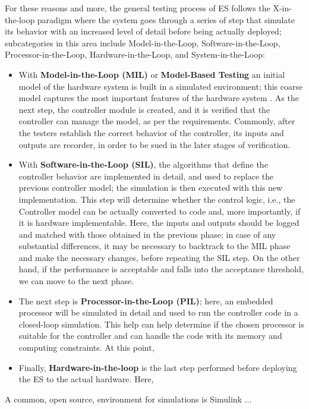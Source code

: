 For these reasons and more, the general testing process of ES follows the X-in-the-loop paradigm \cite{DBLP:journals/software/GarousiFKY18} where the system goes through a series of step that simulate its behavior with an increased level of detail before being actually deployed; subcategories in this area include Model-in-the-Loop, Software-in-the-Loop, Processor-in-the-Loop, Hardware-in-the-Loop, and System-in-the-Loop:
\begin{itemize}
    \item With \textbf{Model-in-the-Loop (MIL)} or \textbf{Model-Based Testing} an initial model of the hardware system is built in a simulated environment; this coarse model captures the most important features of the hardware system \cite{XLoop}. As the next step, the controller module is created, and it is verified that the controller can manage the model, as per the requirements. Commonly, after the testers establish the correct behavior of the controller, its inputs and outputs are recorder, in order to be sued in the later stages of verification.
    \item With \textbf{Software-in-the-Loop (SIL)}, the algorithms that define the controller behavior are implemented in detail, and used to replace the previous controller model; the simulation is then executed with this new implementation. This step will determine whether the control logic, i.e., the Controller model can be actually converted to code and, more importantly, if it is hardware implementable. Here, the inputs and outputs should be logged and matched with those obtained in the previous phase; in case of any substantial differences, it may be necessary to backtrack to the MIL phase and make the necessary changes, before repeating the SIL step. On the other hand, if the performance is acceptable and falls into the acceptance threshold, we can move to the next phase.
    \item The next step is \textbf{Processor-in-the-Loop (PIL)}; here, an embedded processor will be simulated in detail and used to run the controller code in a closed-loop simulation. This help can help determine if the chosen processor is suitable for the controller and can handle the code with its memory and computing constraints. At this point, 
    \item Finally, \textbf{Hardware-in-the-loop} is the last step performed before deploying the ES to the actual hardware. Here, 
\end{itemize}


A common, open source, environment for simulations is Simulink ...